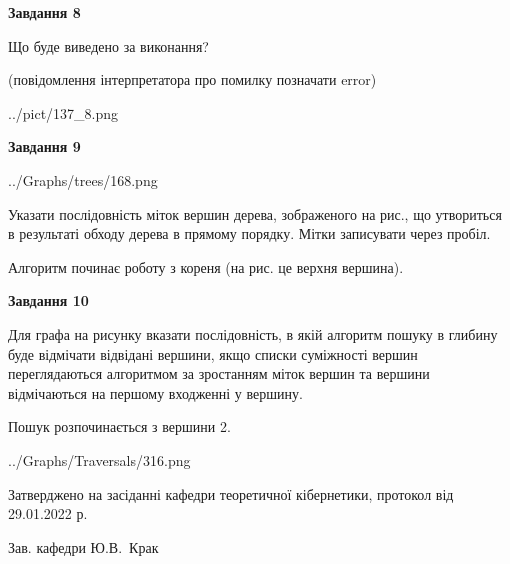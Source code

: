 \documentclass[12pt, ukrainian]{article}
\begin{document}
{\begin {large}
{\begin {center}\textbf{Завдання 8}\end {center}}\par
Що буде виведено за виконання?\par
 (повідомлення інтерпретатора про помилку позначати error)\par
\begin{center}
	{../pict/137_8.png}
\end{center}
\newpage

{\begin {center}\textbf{Завдання 9}\end {center}}\par

\begin{center}
	{../Graphs/trees/168.png}
\end{center}
Указати послідовність міток вершин дерева, зображеного на рис., що утвориться в результаті обходу дерева в прямому порядку. Мітки записувати через пробіл.\par Алгоритм починає роботу з кореня (на рис. це верхня вершина).\par
\newpage

{\begin {center}\textbf{Завдання 10}\end {center}}\par
Для графа на рисунку вказати послідовність, в якій алгоритм пошуку в глибину буде відмічати відвідані вершини, якщо списки суміжності вершин переглядаються алгоритмом за зростанням міток вершин та вершини відмічаються на першому вход\-женні у вершину.\par
Пошук розпочинається з вершини 2.\par

\begin{center}
	{../Graphs/Traversals/316.png}
\end{center}\par
\newpage


\end {large}
}
{\smallskip \begin {small} Затверджено на засіданні кафедри теоретичної кібернетики, протокол  від   29.01.2022 р.\par\smallskip\smallskip
{\parbox {6.5 cm}{Зав. кафедри \dotfill Ю.В.~Крак}} \end{small}}
\end{document}

